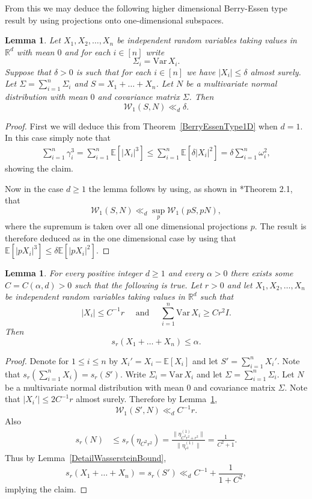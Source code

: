 \documentclass[10pt, english,oneside,reqno]{amsart}
\theoremstyle{plain}
\newtheorem{lemma}[theorem]{Lemma}
\theoremstyle{remark}
\numberwithin{equation}{section}
\numberwithin{figure}{section}
\newcommand{\R}{\mathbb{R}}
\newcommand{\E}{\mathbb{E}}
\begin{document}
	
	From this we may deduce the following higher dimensional Berry-Essen type result by using projections onto one-dimensional subspaces.
	
	\begin{lemma}\label{BerryEssenType}
		Let $X_1, X_2, \ldots , X_n$ be independent random variables taking values in $\R^d$ with mean $0$ and for each $i \in [n]$ write $$\Sigma_i = \mathrm{Var} \, X_i.$$ Suppose that $\delta > 0$ is such that for each $i \in [n]$ we have $|X_i| \leq \delta$ almost surely. Let $\Sigma = \sum_{i = 1}^n \Sigma_i$ and $S = X_1 + \ldots + X_n$. Let $N$ be a multivariate normal distribution with mean $0$ and covariance matrix $\Sigma$. Then $$\mathcal{W}_1(S, N) \ll_d \delta.$$
	\end{lemma}
	
	\begin{proof}
		First we will deduce this from Theorem~\ref{BerryEssenType1D} when $d=1$. In this case simply note that
		\begin{align*}
		\sum_{i=1}^{n} \gamma_i^3  = \sum_{i=1}^n \mathbb{E}[|X_i|^3]  \leq \sum_{i=1}^n \mathbb{E}[\delta |X_i|^2]  = \delta \sum_{i = 1}^n \omega_i^2,
		\end{align*}
		showing the claim.
		
		Now in the case $d \geq 1$ the lemma follows by using, as shown in \cite{BayraktarGuoi2021}*{Theorem 2.1}, that  $$\mathcal{W}_1(S,N) \ll_d \sup_{p} \mathcal{W}_1(pS,pN),$$ where the supremum is taken over all one dimensional projections $p$. The result is therefore deduced as in the one dimensional case by using that $\mathbb{E}[|pX_i|^3] \leq \delta \mathbb{E}[|pX_i|^2]$.
	\end{proof}
	


\begin{lemma}\label{DetailBerryEssen}
    For every positive integer $d\geq 1$ and every $\alpha > 0$ there exists some $C = C(\alpha,d) > 0$ such that the following is true. Let $r > 0$ and let $X_1, X_2, \ldots , X_n$ be independent random variables taking values in $\R^d$ such that $$|X_i| \leq C^{-1} r \quad \text{ and } \quad \sum_{i = 1}^n \mathrm{Var} \, X_i \geq C r^2 I.$$ Then $$s_r(X_1 + \ldots + X_n) \leq \alpha.$$
\end{lemma}

\begin{proof}
    Denote for $1\leq i \leq n$ by $X_i' = X_i - \E[X_i]$ and let $S' = \sum_{i = 1}^n X_i'$. Note that $s_r(\sum_{i = 1}^n X_i) = s_r(S')$. Write $\Sigma_i = \mathrm{Var} \, X_i$ and let $\Sigma = \sum_{i = 1}^n \Sigma_i$. Let $N$ be a multivariate normal distribution with mean $0$ and covariance matrix $\Sigma$. Note that $|X_i'| \leq 2 C^{-1} r$ almost surely. Therefore by Lemma~\ref{BerryEssenType}, $$\mathcal{W}_1(S',N) \ll_d C^{-1} r.$$ Also
    \begin{align*}
        s_r(N) & \leq s_r(\eta_{C^2 r^2} ) = \frac{\| \eta_{C^2 r^2 + r^2}^{(1)} \|}{\| \eta_{r^2}^{(1)} \|} = \frac{1}{C^2 + 1}.
    \end{align*}
    Thus by Lemma~\ref{DetailWassersteinBound}, $$s_r(X_1 + \ldots + X_n) = s_r(S')  \ll_d C^{-1} + \frac{1}{1 + C^2} ,$$ implying the claim. 
\end{proof}
\end{document}

